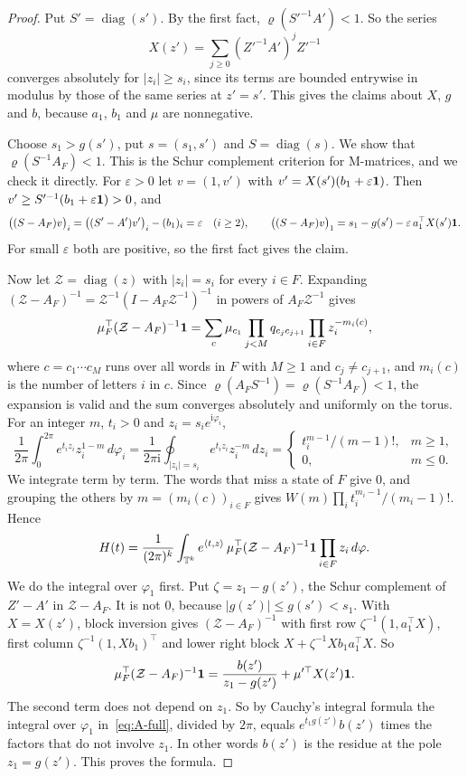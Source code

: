 \begin{proof}
Put $S'=\operatorname{diag}(s')$. By the first fact,
$\varrho(S'^{-1}A')<1$. So the series
\[
X(z')=\sum_{j\ge0}(Z'^{-1}A')^jZ'^{-1}
\]
converges absolutely for $\lvert z_i\rvert\ge s_i$, since its terms are
bounded entrywise in modulus by those of the same series at $z'=s'$. This
gives the claims about $X$, $g$ and $b$, because $a_1$, $b_1$ and $\mu$ are
nonnegative.

Choose $s_1>g(s')$, put $s=(s_1,s')$ and $S=\operatorname{diag}(s)$. We show
that $\varrho(S^{-1}A_F)<1$. This is the Schur complement criterion for
M-matrices, and we check it directly. For $\varepsilon>0$ let $v=(1,v')$
with $v'=X(s')(b_1+\varepsilon\mathbf{1})$. Then $v'\ge
S'^{-1}(b_1+\varepsilon\mathbf{1})>0$, and
\[
\bigl((S-A_F)v\bigr)_i=\bigl((S'-A')v'\bigr)_i-(b_1)_i=\varepsilon\quad(i\ge2),
\qquad
\bigl((S-A_F)v\bigr)_1=s_1-g(s')-\varepsilon\,a_1^\top X(s')\mathbf{1} .
\]
For small $\varepsilon$ both are positive, so the first fact gives the
claim.

Now let $\mathcal Z=\operatorname{diag}(z)$ with $\lvert z_i\rvert=s_i$ for
every $i\in F$. Expanding
$(\mathcal Z-A_F)^{-1}=\mathcal Z^{-1}(I-A_F\mathcal Z^{-1})^{-1}$ in powers
of $A_F\mathcal Z^{-1}$ gives
\[
\mu_F^\top(\mathcal Z-A_F)^{-1}\mathbf{1}=\sum_c\mu_{c_1}\prod_{j<M}q_{c_jc_{j+1}}
\prod_{i\in F}z_i^{-m_i(c)},
\]
where $c=c_1\cdots c_M$ runs over all words in $F$ with $M\ge1$ and
$c_j\ne c_{j+1}$, and $m_i(c)$ is the number of letters $i$ in $c$. Since
$\varrho(A_FS^{-1})=\varrho(S^{-1}A_F)<1$, the expansion is valid and the
sum converges absolutely and uniformly on the torus. For an integer $m$, $t_i>0$ and
$z_i=s_ie^{\mathrm i\varphi_i}$,
\[
\frac1{2\pi}\int_0^{2\pi}e^{t_iz_i}z_i^{1-m}\,d\varphi_i
=\frac1{2\pi\mathrm i}\oint_{\lvert z_i\rvert=s_i}e^{t_iz_i}z_i^{-m}\,dz_i
=\begin{cases}t_i^{m-1}/(m-1)!,&m\ge1,\\ 0,&m\le0.\end{cases}
\]
We integrate term by term. The words that miss a state of $F$ give $0$, and
grouping the others by $m=(m_i(c))_{i\in F}$ gives
$W(m)\prod_it_i^{m_i-1}/(m_i-1)!$. Hence
\begin{equation}\label{eq:A-full}
H(t)=\frac1{(2\pi)^k}\int_{\mathbb T^k}e^{\langle t,z\rangle}\,
\mu_F^\top(\mathcal Z-A_F)^{-1}\mathbf{1}\prod_{i\in F}z_i\,d\varphi .
\end{equation}
We do the integral over $\varphi_1$ first. Put $\zeta=z_1-g(z')$, the Schur
complement of $Z'-A'$ in $\mathcal Z-A_F$. It is not $0$, because
$\lvert g(z')\rvert\le g(s')<s_1$. With $X=X(z')$, block inversion gives
$(\mathcal Z-A_F)^{-1}$ with first row $\zeta^{-1}(1,a_1^\top X)$, first
column $\zeta^{-1}(1,Xb_1)^\top$ and lower right block
$X+\zeta^{-1}Xb_1a_1^\top X$. So
\[
\mu_F^\top(\mathcal Z-A_F)^{-1}\mathbf{1}=\frac{b(z')}{z_1-g(z')}+\mu'^\top X(z')\mathbf{1} .
\]
The second term does not depend on $z_1$. So by Cauchy's integral formula the integral over
$\varphi_1$ in~\eqref{eq:A-full}, divided by $2\pi$, equals
$e^{t_1g(z')}b(z')$ times the factors that do not involve $z_1$. In other
words $b(z')$ is the residue at the pole $z_1=g(z')$. This proves the
formula.
\end{proof}

